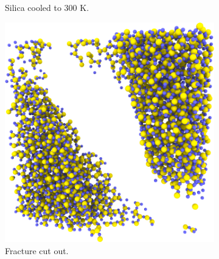 \begin{figure}[htpb]
\begin{subfigure}[t]{\myfigwidth}
        \caption{%
            Silica cooled to 300 K.%
            \label{fig:initialization_step02}%
        }%
    \end{subfigure}%
    \hspace{\myhfillwidth}%
    \begin{subfigure}[t]{\myfigwidth}%
        \includegraphics[width=\textwidth]{images/experimental_procedure/03_10}%
        \caption{%
            Fracture cut out.%
            \label{fig:initialization_step03}%
        }%
        \hspace{8pt}
    \end{subfigure}%
    \\%
    \begin{subfigure}[t]{\myfigwidth}%

\end{subfigure}
\end{figure}
